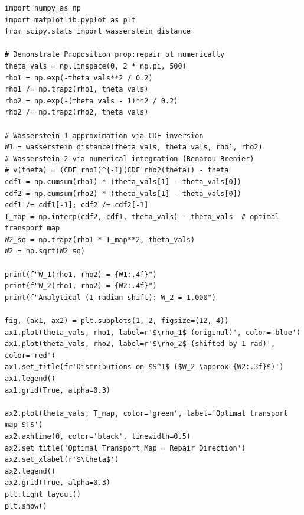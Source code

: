 \documentclass[a4paper,12pt]{article}
\theoremstyle{definition}
\begin{document}
\begin{lstlisting}
import numpy as np
import matplotlib.pyplot as plt
from scipy.stats import wasserstein_distance

# Demonstrate Proposition prop:repair_ot numerically
theta_vals = np.linspace(0, 2 * np.pi, 500)
rho1 = np.exp(-theta_vals**2 / 0.2)
rho1 /= np.trapz(rho1, theta_vals)
rho2 = np.exp(-(theta_vals - 1)**2 / 0.2)
rho2 /= np.trapz(rho2, theta_vals)

# Wasserstein-1 approximation via CDF inversion
W1 = wasserstein_distance(theta_vals, theta_vals, rho1, rho2)
# Wasserstein-2 via numerical integration (Benamou-Brenier)
# v(theta) = (CDF_rho1)^{-1}(CDF_rho2(theta)) - theta
cdf1 = np.cumsum(rho1) * (theta_vals[1] - theta_vals[0])
cdf2 = np.cumsum(rho2) * (theta_vals[1] - theta_vals[0])
cdf1 /= cdf1[-1]; cdf2 /= cdf2[-1]
T_map = np.interp(cdf2, cdf1, theta_vals) - theta_vals  # optimal transport map
W2_sq = np.trapz(rho1 * T_map**2, theta_vals)
W2 = np.sqrt(W2_sq)

print(f"W_1(rho1, rho2) = {W1:.4f}")
print(f"W_2(rho1, rho2) = {W2:.4f}")
print(f"Analytical (1-radian shift): W_2 = 1.000")

fig, (ax1, ax2) = plt.subplots(1, 2, figsize=(12, 4))
ax1.plot(theta_vals, rho1, label=r'$\rho_1$ (original)', color='blue')
ax1.plot(theta_vals, rho2, label=r'$\rho_2$ (shifted by 1 rad)', color='red')
ax1.set_title(fr'Distributions on $S^1$ ($W_2 \approx {W2:.3f}$)')
ax1.legend()
ax1.grid(True, alpha=0.3)

ax2.plot(theta_vals, T_map, color='green', label='Optimal transport map $T$')
ax2.axhline(0, color='black', linewidth=0.5)
ax2.set_title('Optimal Transport Map = Repair Direction')
ax2.set_xlabel(r'$\theta$')
ax2.legend()
ax2.grid(True, alpha=0.3)
plt.tight_layout()
plt.show()
\end{lstlisting}

\clearpage
\nocite{*}


\end{document}
